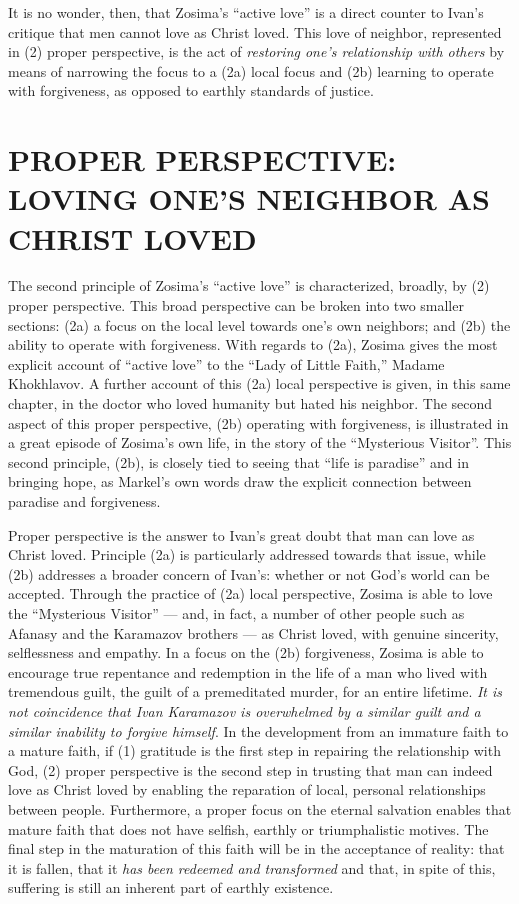 It is no wonder, then, that Zosima's ``active love'' is a direct counter to Ivan's critique that men cannot love as Christ loved. This love of neighbor, represented in (2) proper perspective, is the act of \emph{restoring one's relationship with others} by means of narrowing the focus to a (2a) local focus and (2b) learning to operate with forgiveness, as opposed to earthly standards of justice.

\chapter{PROPER PERSPECTIVE: LOVING ONE'S NEIGHBOR AS CHRIST LOVED}
	The second principle of Zosima's ``active love'' is characterized, broadly, by (2) proper perspective. This broad perspective can be broken into two smaller sections: (2a) a focus on the local level towards one's own neighbors; and (2b) the ability to operate with forgiveness. With regards to (2a), Zosima gives the most explicit account of ``active love'' to the ``Lady of Little Faith,'' Madame Khokhlavov. A further account of this (2a) local perspective is given, in this same chapter, in the doctor who loved humanity but hated his neighbor. The second aspect of this proper perspective, (2b) operating with forgiveness, is illustrated in a great episode of Zosima's own life, in the story of the ``Mysterious Visitor''. This second principle, (2b), is closely tied to seeing that ``life is paradise'' and in bringing hope, as Markel's own words draw the explicit connection between paradise and forgiveness.
	
	Proper perspective is the answer to Ivan's great doubt that man can love as Christ loved. Principle (2a) is particularly addressed towards that issue, while (2b) addresses a broader concern of Ivan's: whether or not God's world can be accepted. Through the practice of (2a) local perspective, Zosima is able to love the ``Mysterious Visitor'' --- and, in fact, a number of other people such as Afanasy and the Karamazov brothers --- as Christ loved, with genuine sincerity, selflessness and empathy. In a focus on the (2b) forgiveness, Zosima is able to encourage true repentance and redemption in the life of a man who lived with tremendous guilt, the guilt of a premeditated murder, for an entire lifetime. \emph{It is not coincidence that Ivan Karamazov is overwhelmed by a similar guilt and a similar inability to forgive himself}. In the development from an immature faith to a mature faith, if (1) gratitude is the first step in repairing the relationship with God, (2) proper perspective is the second step in trusting that man can indeed love as Christ loved by enabling the reparation of local, personal relationships between people. Furthermore, a proper focus on the eternal salvation enables that mature faith that does not have selfish, earthly or triumphalistic motives. The final step in the maturation of this faith will be in the acceptance of reality: that it is fallen, that it \emph{has been redeemed and transformed} and that, in spite of this, suffering is still an inherent part of earthly existence.
	 

